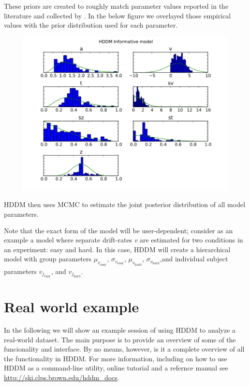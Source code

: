 \documentclass[letterpaper,10pt,english]{sphinxmanual}
\begin{document}
These priors are created to roughly match parameter values reported in
the literature and collected by \citep{MatzkeWagenmakers09}. In the
below figure we overlayed those empirical values with the prior
distribution used for each parameter.
\begin{figure}[htbp]
\centering

\includegraphics[scale=.5]{hddm_info_priors.pdf}
\end{figure}

HDDM then uses MCMC to estimate the joint posterior distribution of
all model parameters.

Note that the exact form of the model will be user-dependent; consider
as an example a model where separate drift-rates \emph{v} are estimated for
two conditions in an experiment: easy and hard. In this case, HDDM
will create a hierarchical model with group parameters
$\mu_{v_{\text{easy}}}$, $\sigma_{v_{\text{easy}}}$,
$\mu_{v_{\text{hard}}}$, $\sigma_{v_{\text{hard}}}$,and individual subject parameters $v_{j_{\text{easy}}}$, and $v_{j_{\text{hard}}}$.

\section{Real world example}
\label{demo:index-0}\label{demo:demo}\label{demo:chap-demo}\label{demo::doc}\label{demo:patsy}
In the following we will show an example session of using HDDM to
analyze a real-world dataset. The main purpose is to provide an overview
of some of the funcionality and interface. By no means, however, is it a
complete overview of all the functionality in HDDM. For more
information, including on how to use HDDM as a command-line utility,
online tutorial and a refernce manual
see \href{http://ski.clps.brown.edu/hddm\_docs}{http://ski.clps.brown.edu/hddm\_docs}.
\end{document}
